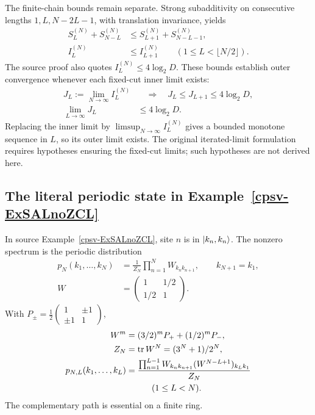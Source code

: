 \documentclass[aps,pra,reprint,nofootinbib,onecolumn]{revtex4-2}
\begin{document}
The finite-chain bounds remain separate. Strong subadditivity
on consecutive lengths $1,L,N-2L-1$, with translation invariance,
yields
\begin{align}
	S_L^{(N)}+S_{N-L}^{(N)}
	          & \leq S_{L+1}^{(N)}+S_{N-L-1}^{(N)},\nonumber \\
	I_L^{(N)} & \leq I_{L+1}^{(N)}
	\qquad(1\leq L<\lfloor N/2\rfloor).
	\label{eq:finite-monotonicity}
\end{align}
The source proof also quotes $I_L^{(N)}\leq4\log_2D$.
These bounds establish outer convergence whenever each fixed-cut
inner limit exists:
\begin{align}
	J_L:=\lim_{N\to\infty}I_L^{(N)}
	                     & \quad\Longrightarrow\quad
	J_L\leq J_{L+1}\leq4\log_2D,\nonumber            \\
	\lim_{L\to\infty}J_L & \leq4\log_2D.
	\label{eq:JL-limits}
\end{align}
Replacing the inner limit by $\limsup_{N\to\infty}I_L^{(N)}$ gives
a bounded monotone sequence in $L$, so its outer limit exists. The original
iterated-limit formulation requires hypotheses ensuring the fixed-cut
limits; such hypotheses are not derived here.

\subsection{The literal periodic state in Example~\ref{cpsv-ExSALnoZCL}}

In source Example~\ref{cpsv-ExSALnoZCL}, site $n$ is in
$\lvert k_n,k_n\rangle$. The nonzero spectrum is the periodic distribution
\begin{align}
	p_N(k_1,\ldots,k_N) & =\frac1{Z_N}\prod_{n=1}^NW_{k_nk_{n+1}},
	\qquad k_{N+1}=k_1,\nonumber                                     \\
	W                   & =\begin{pmatrix}1&1/2\\1/2&1\end{pmatrix}.
	\label{eq:W-def}
\end{align}
With
$P_\pm=\frac12(\begin{smallmatrix}1&\pm1\\\pm1&1\end{smallmatrix})$,
\begin{align}
	W^m & =(3/2)^mP_++(1/2)^mP_-,\nonumber       \\
	Z_N & =\operatorname{tr} W^N=(3^N+1)/2^N,\nonumber         \\
	p_{N,L}(k_1,\ldots,k_L)
	    & =\frac{\prod_{n=1}^{L-1}W_{k_nk_{n+1}}
			       (W^{N-L+1})_{k_Lk_1}}{Z_N}\nonumber \\
	    & \hspace{3em}(1\leq L<N).
	\label{eq:W-marginals}
\end{align}
The complementary path is essential on a finite ring.
\end{document}
